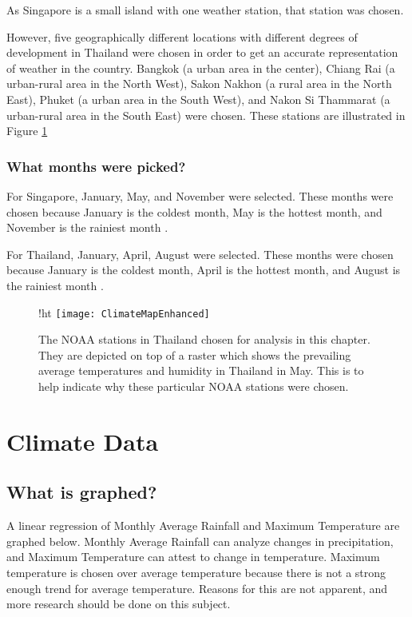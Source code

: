 As Singapore is a small island with one weather station, that station was chosen. 

However, five geographically different locations with different degrees of development in Thailand were chosen in order to get an accurate representation of weather in the country. Bangkok (a urban area in the center), Chiang Rai (a urban-rural area in the North West), Sakon Nakhon (a rural area in the North East), Phuket (a urban area in the South West), and Nakon Si Thammarat (a urban-rural area in the South East) were chosen. These stations are illustrated in Figure \ref{fig:stationsmap}

\subsubsection{What months were picked?}

For Singapore, January, May, and November were selected. These months were chosen because January is the coldest month, May is the hottest month, and November is the rainiest month \citep{singaporeweather}. 

For Thailand, January, April, August were selected. These months were chosen because January is the coldest month, April is the hottest month, and August is the rainiest month \citep{thailandweather}. 

\begin{figure}{!ht}
	\texttt{[image: ClimateMapEnhanced]}
  \caption{The NOAA stations in Thailand chosen for analysis in this chapter. They are depicted on top of a raster which shows the prevailing average temperatures and humidity in Thailand in May. This is to help indicate why these particular NOAA stations were chosen.}
  \label{fig:stationsmap}
\end{figure}

\section{Climate Data}

\subsection{What is graphed?}

A linear regression of Monthly Average Rainfall and Maximum Temperature are graphed below. Monthly Average Rainfall can analyze changes in precipitation, and Maximum Temperature can attest to change in temperature. Maximum temperature is chosen over average temperature because there is not a strong enough trend for average temperature. Reasons for this are not apparent, and more research should be done on this subject.  

